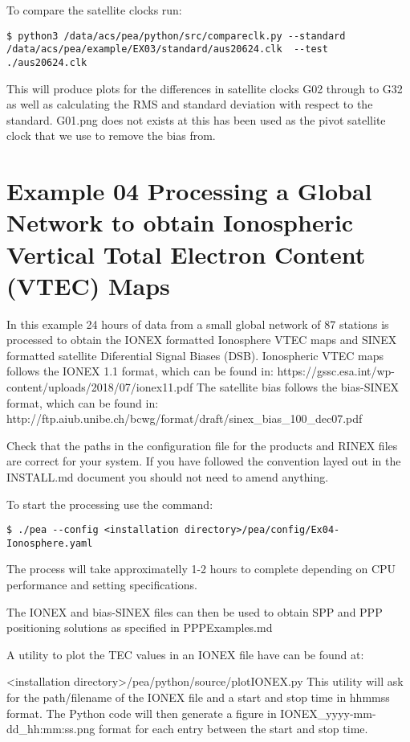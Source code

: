 To compare the satellite clocks run:
\begin{verbatim}
$ python3 /data/acs/pea/python/src/compareclk.py --standard /data/acs/pea/example/EX03/standard/aus20624.clk  --test ./aus20624.clk
\end{verbatim}
This will produce plots for the differences in satellite clocks G02 through to G32 as well as calculating the RMS and standard deviation with respect to the standard. G01.png does not exists at this has been used as the pivot satellite clock that we use to remove the bias from.

\section{Example 04 Processing a Global Network to obtain Ionospheric Vertical Total Electron Content (VTEC) Maps}
In this example 24 hours of data from a small global network of 87 stations is processed to obtain the IONEX formatted Ionosphere VTEC maps and SINEX formatted satellite Diferential Signal Biases (DSB). Ionospheric VTEC maps follows the IONEX 1.1 format, which can be found in: https://gssc.esa.int/wp-content/uploads/2018/07/ionex11.pdf The satellite bias follows the bias-SINEX format, which can be found in: http://ftp.aiub.unibe.ch/bcwg/format/draft/sinex_bias_100_dec07.pdf

Check that the paths in the configuration file for the products and RINEX files are correct for your system. If you have followed the convention layed out in the INSTALL.md document you should not need to amend anything.

To start the processing use the command:
\begin{verbatim}
$ ./pea --config <installation directory>/pea/config/Ex04-Ionosphere.yaml
\end{verbatim}
The process will take approximatelly 1-2 hours to complete depending on CPU performance and setting specifications.

The IONEX and bias-SINEX files can then be used to obtain SPP and PPP positioning solutions as specified in PPPExamples.md

A utility to plot the TEC values in an IONEX file have can be found at:

<installation directory>/pea/python/source/plotIONEX.py
This utility will ask for the path/filename of the IONEX file and a start and stop time in hhmmss format. The Python code will then generate a figure in IONEX_yyyy-mm-dd_hh:mm:ss.png format for each entry between the start and stop time.


